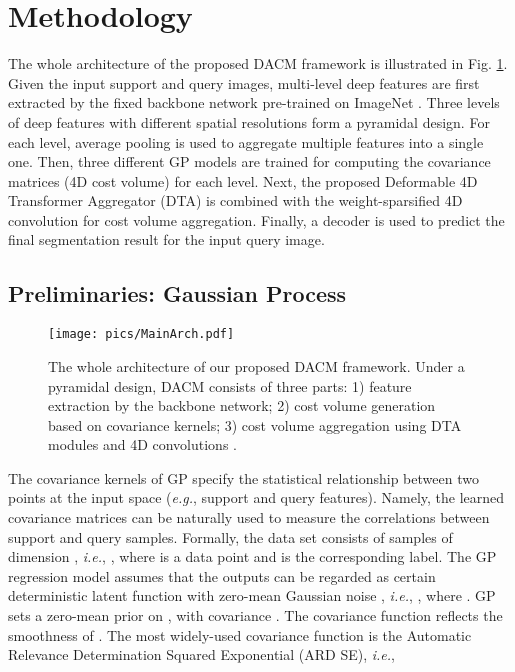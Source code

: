 \documentclass[runningheads]{llncs}
\begin{document}
\section{Methodology}
The whole architecture of the proposed DACM framework is illustrated in Fig. \ref{arch}. Given the input support and query images, multi-level deep features are first extracted by the fixed backbone network pre-trained on ImageNet \cite{russakovsky2015imagenet}. Three levels of deep features with different spatial resolutions form a pyramidal design. For each level, average pooling is used to aggregate multiple features into a single one. Then, three different GP models are trained for computing the covariance matrices (4D cost volume) for each level. Next, the proposed Deformable 4D Transformer Aggregator (DTA) is combined with the weight-sparsified 4D convolution for cost volume aggregation. Finally, a decoder is used to predict the final segmentation result for the input query image.

\subsection{Preliminaries: Gaussian Process}
\label{GP}
\begin{figure}[t]
	\centering
	\texttt{[image: pics/MainArch.pdf]}
	\caption{The whole architecture of our proposed DACM framework. Under a pyramidal design, DACM consists of three parts: 1) feature extraction by the backbone network; 2) cost volume generation based on covariance kernels; 3) cost volume aggregation using DTA modules and 4D convolutions \cite{min2021hypercorrelation}.}
	\label{arch}
\end{figure} 

The covariance kernels of GP specify the statistical relationship between two points at the input space (\textit{e.g.}, support and query features). Namely, the learned covariance matrices can be naturally used to measure the correlations between support and query samples. Formally, the data set consists of  samples of dimension , \textit{i.e.}, , where  is a data point and  is the corresponding label. The GP regression model assumes that the outputs  can be regarded as certain deterministic latent function  with zero-mean Gaussian noise , \textit{i.e.}, , where . GP sets a zero-mean prior on , with covariance . The covariance function  reflects the smoothness of . The most widely-used covariance function is the Automatic Relevance Determination Squared Exponential (ARD SE), \textit{i.e.},
\end{document}
